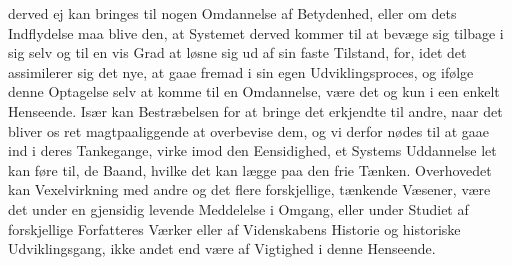 \documentclass[12pt,a4paper]{book}
\newcommand{\apage}[1]{\marginnote{\footnotesize\textit{[#1]}}}
\begin{document}
derved ej kan bringes til nogen Omdannelse af Betydenhed, eller om dets Indflydelse
maa blive den, at Systemet derved kommer til at bevæge sig tilbage i sig selv og
til en vis Grad at løsne sig ud af sin faste Tilstand, for, idet det assimilerer
sig det nye, at gaae fremad i sin egen Udviklingsproces, og ifølge denne Optagelse
selv at komme til en Omdannelse, være det og kun i een enkelt Henseende. Især kan
Bestræbelsen for at bringe det erkjendte til andre, naar \apage{141} det bliver os ret
magtpaaliggende at overbevise dem, og vi derfor nødes til at gaae ind i deres
Tankegange, virke imod den Eensidighed, et Systems Uddannelse let kan føre til, de
Baand, hvilke det kan lægge paa den frie Tænken. Overhovedet kan Vexelvirkning med
andre og det flere forskjellige, tænkende Væsener, være det under en gjensidig
levende Meddelelse i Omgang, eller under Studiet af forskjellige Forfatteres
Værker eller af Videnskabens Historie og historiske Udviklingsgang, ikke andet end
være af Vigtighed i denne Henseende.
\end{document}
